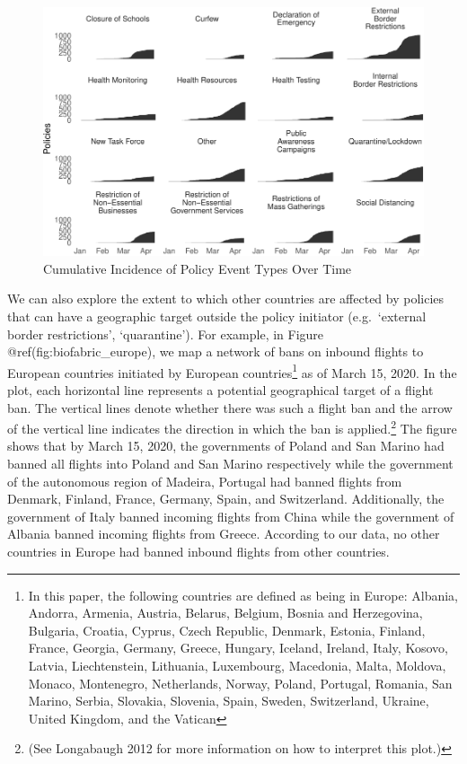 \documentclass[]{article}
\let\rmarkdownfootnote\footnote%
\def\footnote{\protect\rmarkdownfootnote}
\begin{document}
\begin{figure}
\centering
\includegraphics{corona_wp_files/figure-latex/overtime-1.pdf}
\caption{\label{fig:overtime}Cumulative Incidence of Policy Event Types Over Time}
\end{figure}

We can also explore the extent to which other countries are affected by policies that can have a geographic target outside the policy initiator (e.g.~`external border restrictions', `quarantine'). For example, in Figure @ref(fig:biofabric\_europe), we map a network of bans on inbound flights to European countries initiated by European countries\footnote{In this paper, the following countries are defined as being in Europe: Albania, Andorra, Armenia, Austria, Belarus, Belgium, Bosnia and Herzegovina, Bulgaria, Croatia, Cyprus, Czech Republic, Denmark, Estonia, Finland, France, Georgia, Germany, Greece, Hungary, Iceland, Ireland, Italy, Kosovo, Latvia, Liechtenstein, Lithuania, Luxembourg, Macedonia, Malta, Moldova, Monaco, Montenegro, Netherlands, Norway, Poland, Portugal, Romania, San Marino, Serbia, Slovakia, Slovenia, Spain, Sweden, Switzerland, Ukraine, United Kingdom, and the Vatican} as of March 15, 2020. In the plot, each horizontal line represents a potential geographical target of a flight ban. The vertical lines denote whether there was such a flight ban and the arrow of the vertical line indicates the direction in which the ban is applied.\footnote{(See Longabaugh 2012 for more information on how to interpret this plot.)} The figure shows that by March 15, 2020, the governments of Poland and San Marino had banned all flights into Poland and San Marino respectively while the government of the autonomous region of Madeira, Portugal had banned flights from Denmark, Finland, France, Germany, Spain, and Switzerland. Additionally, the government of Italy banned incoming flights from China while the government of Albania banned incoming flights from Greece. According to our data, no other countries in Europe had banned inbound flights from other countries.
\end{document}
